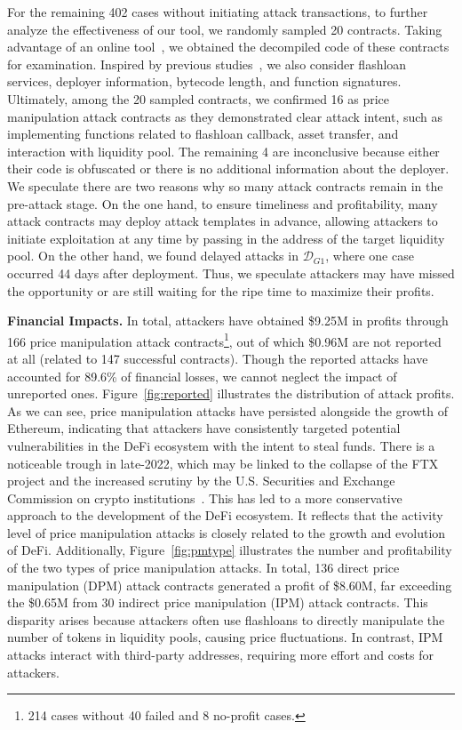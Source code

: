 For the remaining 402 cases without initiating attack transactions, to further analyze the effectiveness of our tool, we randomly sampled 20 contracts. Taking advantage of an online tool~\cite{dedaub}, we obtained the decompiled code of these contracts for examination. Inspired by previous studies~\cite{ren2024lookahead, forta}, we also consider flashloan services, deployer information, bytecode length, and function signatures. Ultimately, among the 20 sampled contracts, we confirmed 16 as price manipulation attack contracts as they demonstrated clear attack intent, such as implementing functions related to flashloan callback, asset transfer, and interaction with liquidity pool. The remaining 4 are inconclusive because either their code is obfuscated or there is no additional information about the deployer. We speculate there are two reasons why so many attack contracts remain in the pre-attack stage. On the one hand, to ensure timeliness and profitability, many attack contracts may deploy attack templates in advance, allowing attackers to initiate exploitation at any time by passing in the address of the target liquidity pool. On the other hand, we found delayed attacks in $\mathcal{D}_{G1}$, where one case occurred 44 days after deployment. Thus, we speculate attackers may have missed the opportunity or are still waiting for the ripe time to maximize their profits.



\noindent
\textbf{Financial Impacts.} 
In total, attackers have obtained \$9.25M in profits through 166 price manipulation attack contracts\footnote{214 cases without 40 failed and 8 no-profit cases.}, out of which \$0.96M are not reported at all (related to 147 successful contracts).
Though the reported attacks have accounted for 89.6\% of financial losses, we cannot neglect the impact of unreported ones.
Figure~\ref{fig:reported} illustrates the distribution of attack profits.
As we can see, price manipulation attacks have persisted alongside the growth of Ethereum, indicating that attackers have consistently targeted potential vulnerabilities in the DeFi ecosystem with the intent to steal funds. There is a noticeable trough in late-2022, which may be linked to the collapse of the FTX project and the increased scrutiny by the U.S. Securities and Exchange Commission on crypto institutions~\cite{ftx}. This has led to a more conservative approach to the development of the DeFi ecosystem. It reflects that the activity level of price manipulation attacks is closely related to the growth and evolution of DeFi.
Additionally, Figure~\ref{fig:pmtype} illustrates the number and profitability of the two types of price manipulation attacks. In total, 136 direct price manipulation (DPM) attack contracts generated a profit of \$8.60M, far exceeding the \$0.65M from 30 indirect price manipulation (IPM) attack contracts. This disparity arises because attackers often use flashloans to directly manipulate the number of tokens in liquidity pools, causing price fluctuations. In contrast, IPM attacks interact with third-party addresses, requiring more effort and costs for attackers.


